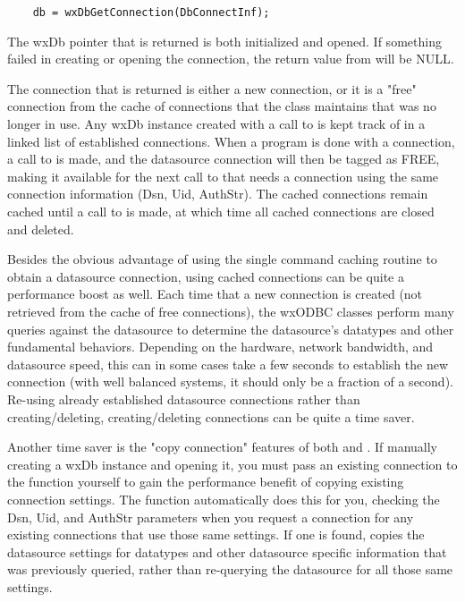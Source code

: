\begin{verbatim}
    db = wxDbGetConnection(DbConnectInf);
\end{verbatim}

The wxDb pointer that is returned is both initialized and opened.  If 
something failed in creating or opening the connection, the return value 
from  will be NULL.

The connection that is returned is either a new connection, or it is a 
"free" connection from the cache of connections that the class maintains 
that was no longer in use.  Any wxDb instance created with a call to 
 is kept track of in a linked list of established 
connections.  When a program is done with a connection, a call to 
 is made, and the datasource 
connection will then be tagged as FREE, making it available for the next 
call to  that needs a connection 
using the same connection information (Dsn, Uid, AuthStr).  The cached 
connections remain cached until a call to  is made, 
at which time all cached connections are closed and deleted.

Besides the obvious advantage of using the single command caching routine to 
obtain a datasource connection, using cached connections can be quite a 
performance boost as well.  Each time that a new connection is created 
(not retrieved from the cache of free connections), the wxODBC classes 
perform many queries against the datasource to determine the datasource's 
datatypes and other fundamental behaviors.  Depending on the hardware, 
network bandwidth, and datasource speed, this can in some cases take a 
few seconds to establish the new connection (with well balanced systems, 
it should only be a fraction of a second).  Re-using already established 
datasource connections rather than creating/deleting, creating/deleting 
connections can be quite a time saver.

Another time saver is the "copy connection" features of both 
 and .  
If manually creating a wxDb instance and opening it, you must pass an existing 
connection to the  function yourself to gain the performance 
benefit of copying existing connection settings.  The 
 function automatically does this 
for you, checking the Dsn, Uid, and AuthStr parameters when you request 
a connection for any existing connections that use those same settings.  
If one is found,  copies the datasource settings for 
datatypes and other datasource specific information that was previously 
queried, rather than re-querying the datasource for all those same settings.

